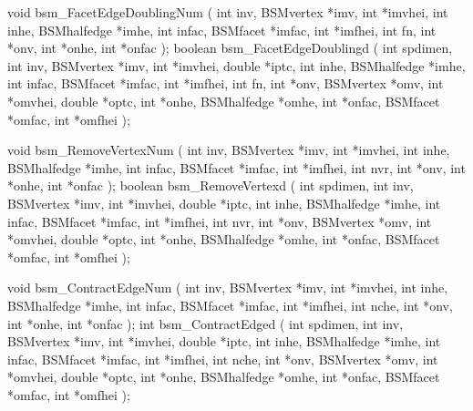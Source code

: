 \begin{listingC}
void bsm_FacetEdgeDoublingNum ( int inv, BSMvertex *imv, int *imvhei,
                                int inhe, BSMhalfedge *imhe,
                                int infac, BSMfacet *imfac, int *imfhei,
                                int fn,
                                int *onv, int *onhe, int *onfac );
boolean bsm_FacetEdgeDoublingd ( int spdimen,
                 int inv, BSMvertex *imv, int *imvhei, double *iptc,
                 int inhe, BSMhalfedge *imhe,
                 int infac, BSMfacet *imfac, int *imfhei,
                 int fn,
                 int *onv, BSMvertex *omv, int *omvhei,
                 double *optc,
                 int *onhe, BSMhalfedge *omhe,
                 int *onfac, BSMfacet *omfac, int *omfhei );
\end{listingC}

\begin{listingC}
void bsm_RemoveVertexNum ( int inv, BSMvertex *imv, int *imvhei,
                           int inhe, BSMhalfedge *imhe,
                           int infac, BSMfacet *imfac, int *imfhei,
                           int nvr,
                           int *onv, int *onhe, int *onfac );
boolean bsm_RemoveVertexd ( int spdimen,
                int inv, BSMvertex *imv, int *imvhei, double *iptc,
                int inhe, BSMhalfedge *imhe,
                int infac, BSMfacet *imfac, int *imfhei,
                int nvr,
                int *onv, BSMvertex *omv, int *omvhei, double *optc,
                int *onhe, BSMhalfedge *omhe,
                int *onfac, BSMfacet *omfac, int *omfhei );
\end{listingC}

\begin{listingC}
void bsm_ContractEdgeNum ( int inv, BSMvertex *imv, int *imvhei,
                           int inhe, BSMhalfedge *imhe,
                           int infac, BSMfacet *imfac, int *imfhei,
                           int nche,
                           int *onv, int *onhe, int *onfac );
int bsm_ContractEdged ( int spdimen,
                int inv, BSMvertex *imv, int *imvhei, double *iptc,
                int inhe, BSMhalfedge *imhe,
                int infac, BSMfacet *imfac, int *imfhei,
                int nche,
                int *onv, BSMvertex *omv, int *omvhei, double *optc,
                int *onhe, BSMhalfedge *omhe,
                int *onfac, BSMfacet *omfac, int *omfhei );
\end{listingC}

